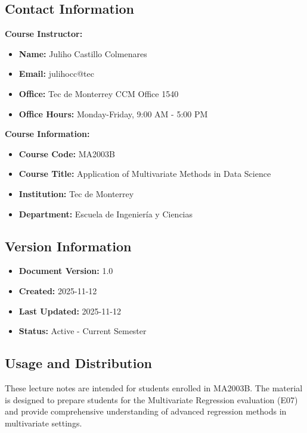 \documentclass[
]{article}
\begin{document}
\textbf{ }

\subsection{Contact Information}

\textbf{Course Instructor:}

\begin{itemize}
\item
  \textbf{Name:} Juliho Castillo Colmenares
\item
  \textbf{Email:} julihocc@tec
\item
  \textbf{Office:} Tec de Monterrey CCM Office 1540
\item
  \textbf{Office Hours:} Monday-Friday, 9:00 AM - 5:00 PM
\end{itemize}

\textbf{Course Information:}

\begin{itemize}
\item
  \textbf{Course Code:} MA2003B
\item
  \textbf{Course Title:} Application of Multivariate Methods in Data
  Science
\item
  \textbf{Institution:} Tec de Monterrey
\item
  \textbf{Department:} Escuela de Ingeniería y Ciencias
\end{itemize}

\textbf{ }

\subsection{Version Information}

\begin{itemize}
\item
  \textbf{Document Version:} 1.0
\item
  \textbf{Created:} 2025-11-12
\item
  \textbf{Last Updated:} 2025-11-12
\item
  \textbf{Status:} Active - Current Semester
\end{itemize}

\textbf{ }

\subsection{Usage and Distribution}

These lecture notes are intended for students enrolled in MA2003B. The
material is designed to prepare students for the Multivariate Regression
evaluation (E07) and provide comprehensive understanding of advanced
regression methods in multivariate settings.
\end{document}
